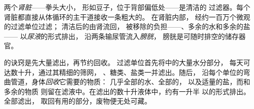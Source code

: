 \begin{definition}[肾脏与泌尿系统]\label{def:g7:removing-wastes:kidneys}
两个\emph{肾脏}——拳头大小，
形如豆子，位于背部偏低处——是清洁的
过滤器。每个肾脏都直接从体循环的主干道接收一条粗大的。
在肾脏内部，
经约一百万个微观的过滤单位过滤；
清洁后的由肾流回，
被移除的负担——、多余的水和多余的盐——
以\emph{尿液}的形式排出，
沿两条输尿管流入\emph{膀胱}，
膀胱是可随时排空的储存器官。
\end{definition}

\begin{proposition}\label{prop:g7:removing-wastes:filter}
的诀窍是先大量滤出，再节约回收。
过滤单位首先将中的大量水分部分，
每天可达数十升，通过其精细的筛网，
、糖类、盐类一并滤出。随后，
沿每个单位的弯曲管道，身体\emph{回收}它需要的物质：
几乎全部的水、全部的，
以及适量的盐，而和多余的物质
则留在滤液中。在滤出的数十升液体中，约有一升半
以的形式排出。全部滤出，
取回有用的部分，废物便无处可藏。
\end{proposition}
\admitted

